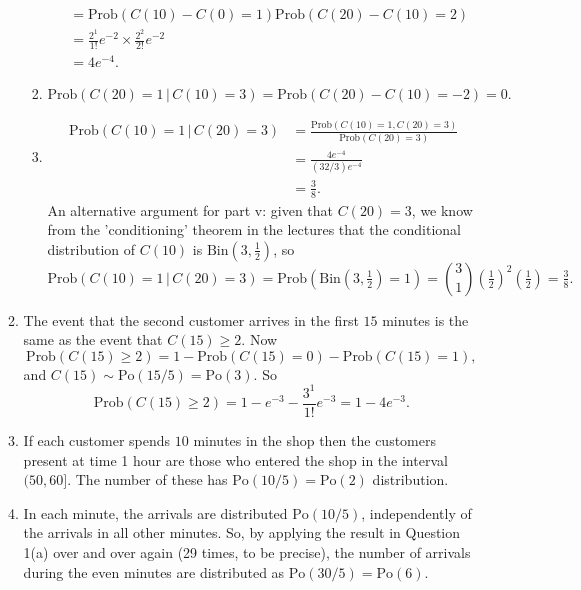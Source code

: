\documentclass[11pt,a4paper]{article}
\begin{document}
\begin{enumerate}
\begin{enumerate}
\begin{enumerate}
\begin{align*}
                    &= \text{Prob}(C(10)-C(0)=1)\text{Prob}(C(20)-C(10)=2)\\
                    &= \frac{2^1}{1!}e^{-2}\times \frac{2^2}{2!}e^{-2}\\
                    &= 4e^{-4}.
                \end{align*}
                \item 
                $$
                \text{Prob}(C(20)=1\,|\, C(10)=3) = \text{Prob}(C(20)-C(10)=-2)=0.
                $$
                \item 
                \begin{align*}
                    \text{Prob}(C(10)=1\,|\, C(20)=3)
                    &= \frac{\text{Prob}(C(10)=1,C(20)=3)}{\text{Prob}(C(20)=3)}\\
                    &= \frac{4e^{-4}}{(32/3)e^{-4}}\\
                    &= \frac{3}{8}.
                \end{align*}
                An alternative argument for part v: given that $C(20) = 3$, we know from the 'conditioning' theorem in the lectures that the conditional distribution of $C(10)$ is $\text{Bin}(3,\tfrac{1}{2})$, so 
                $$
                \text{Prob}(C(10)=1\,|\, C(20)=3)=\text{Prob}(\text{Bin}(3,\tfrac{1}{2})=1)=\binom{3}{1}(\tfrac{1}{2})^2(\tfrac{1}{2})=\tfrac{3}{8}.
                $$
            \end{enumerate}
            \item The event that the second customer arrives in the first $15$ minutes is the same as the event that $C(15)\geq 2$. Now
            $$
            \text{Prob}(C(15)\geq 2) = 1- \text{Prob}(C(15)=0)-\text{Prob}(C(15)=1),
            $$
            and $C(15)\sim \text{Po}(15/5)=\text{Po}(3)$. So 
            $$
            \text{Prob}(C(15)\geq 2) = 1- e^{-3}-\frac{3^1}{1!}e^{-3}=1-4e^{-3}.
            $$
            \item If each customer spends $10$ minutes in the shop then the customers present at time 1 hour are those who entered the shop in the interval $(50,60]$. The number of these has $\text{Po}(10/5)=\text{Po}(2)$ distribution.
            \item In each minute, the arrivals are distributed $\text{Po}(10/5)$, independently of the arrivals in all other minutes. So, by applying the result in Question 1(a) over and over again (29 times, to be precise), the number of arrivals during the even minutes are distributed as $\text{Po}(30/5)=\text{Po}(6)$.
        \end{enumerate}

\end{enumerate}
\end{document}
